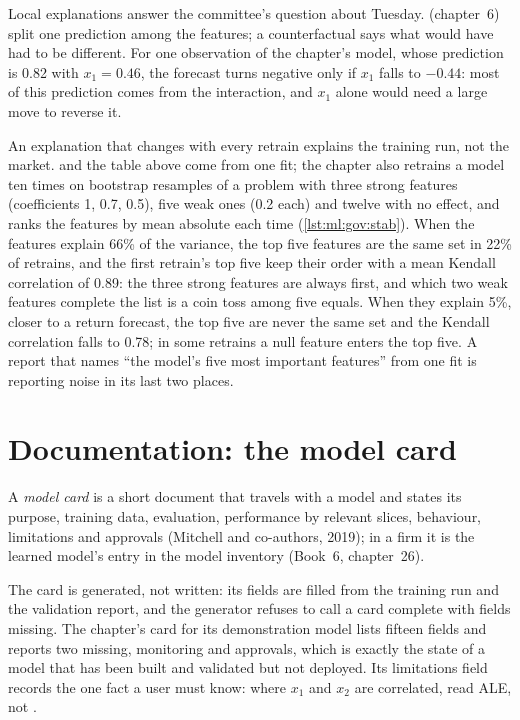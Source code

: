 Local explanations answer the committee's question about Tuesday.  (chapter~6) split one prediction among the
features; a counterfactual says what would have had to be different. For one observation of the chapter's model, whose
prediction is 0.82 with $x_1 = 0.46$, the forecast turns negative only if $x_1$ falls to $-0.44$: most of this prediction
comes from the interaction, and $x_1$ alone would need a large move to reverse it.

An explanation that changes with every retrain explains the training run, not the market.  and the
table above come from one fit; the chapter also retrains a model ten times on bootstrap resamples of a problem with three
strong features (coefficients 1, 0.7, 0.5), five weak ones (0.2 each) and twelve with no effect, and ranks the features by
mean absolute  each time (\cref{lst:ml:gov:stab}). When the features explain 66\% of the variance, the top five
features are the same set in 22\% of retrains, and the first retrain's top five keep their order with a mean Kendall
correlation of 0.89: the three strong features are always first, and which two weak features complete the list is a coin toss
among five equals. When they explain 5\%, closer to a return forecast, the top five are never the same set and the Kendall
correlation falls to 0.78; in some retrains a null feature enters the top five. A report that names ``the model's five most
important features'' from one fit is reporting noise in its last two places.

\section{Documentation: the model card}

\begin{definition}\label{def:ml:interpretability-and-model-governance:card}
A \emph{model card} is a short document that travels with a model and states its purpose, training data,
evaluation, performance by relevant slices, behaviour, limitations and approvals (Mitchell and co-authors, 2019); in a firm
it is the learned model's entry in the model inventory (Book~6, chapter~26).
\end{definition}

The card is generated, not written: its fields are filled from the training run and the validation report, and the generator
refuses to call a card complete with fields missing. The chapter's card for its demonstration model lists fifteen fields and
reports two missing, monitoring and approvals, which is exactly the state of a model that has been built and validated but not
deployed. Its limitations field records the one fact a user must know: where $x_1$ and $x_2$ are correlated, read ALE, not
.

